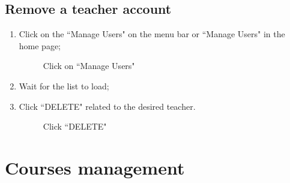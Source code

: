 \documentclass[ManualeUtente]{subfiles}
\begin{document}
\subsection{Remove a teacher account}
\begin{enumerate}
	\item Click on the \textquotedblleft Manage Users" on the menu bar or \textquotedblleft Manage Users" in the home page;
	\begin{figure}[H]
		\centering
		\caption{Click on ``Manage Users"}
		\label{fig:Click on "Manage Users"}
	\end{figure}
	\item Wait for the list to load;
	\item Click \textquotedblleft DELETE" related to the desired teacher.
	\begin{figure}[H]
		\centering
		\caption{Click ``DELETE"}
		\label{fig:Click "DELETE"}
	\end{figure}
\end{enumerate}


\section{Courses management}
\end{document}
